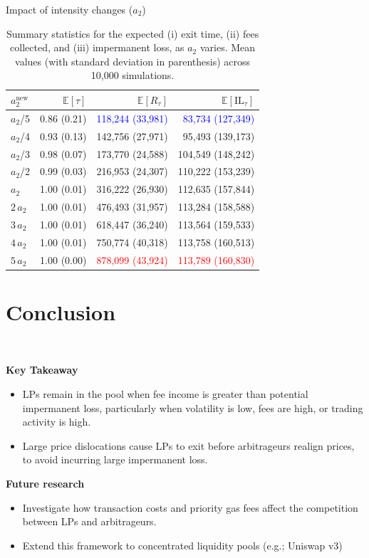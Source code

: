 \documentclass[10pt]{beamer}
\begin{document}
\begin{frame}{Impact of intensity changes ($a_2$)}
\begin{table}[H]
    \centering
    \begin{tabular}{l|rrr}
\hline
\hline
$a_2^{\mathrm{new}}$ & $\mathbb{E}[\tau]$ & $\mathbb{E}[R_\tau]$ & $\mathbb{E}[\mathrm{IL}_\tau]$ \\
\hline
\hline
$a_2$/5 & 0.86 (0.21) & \textcolor{blue}{118,244 (33,981)} & \textcolor{blue}{83,734 (127,349)} \\
$a_2$/4 & 0.93 (0.13) & 142,756 (27,971) & 95,493 (139,173) \\
$a_2$/3 & 0.98 (0.07) & 173,770 (24,588) & 104,549 (148,242) \\
$a_2$/2 & 0.99 (0.03) & 216,953 (24,307) & 110,222 (153,239) \\
$a_2$ & 1.00 (0.01) & 316,222 (26,930) & 112,635 (157,844) \\
$2\,a_2$ & 1.00 (0.01) & 476,493 (31,957) & 113,284 (158,588) \\
$3\,a_2$ & 1.00 (0.01) & 618,447 (36,240) & 113,564 (159,533) \\
$4\,a_2$ & 1.00 (0.01) & 750,774 (40,318) & 113,758 (160,513) \\
$5\,a_2$ & 1.00 (0.00) & \textcolor{red}{878,099 (43,924)} & \textcolor{red}{113,789 (160,830)} \\
\hline
\end{tabular}
    \caption{Summary statistics for the expected (i) exit time, (ii) fees collected, and (iii) impermanent loss, as $a_2$ varies. Mean values (with standard deviation in parenthesis) across 10,000 simulations.}
\end{table}
\end{frame}

\section{Conclusion}
\begin{frame}{\,}

\textbf{Key Takeaway}\pause
\begin{itemize}
	\item LPs remain in the pool when fee income is greater than potential impermanent loss, particularly when volatility is low, fees are high, or trading activity is high.\pause
	\item Large price dislocations cause LPs to exit before arbitrageurs realign prices, to avoid incurring large impermanent loss.\pause
\end{itemize}

\textbf{Future research}\pause
\begin{itemize}
	\item Investigate how transaction costs and priority gas fees affect the competition between LPs and arbitrageurs.\pause
	\item Extend this framework to concentrated liquidity pools (e.g.; Uniswap v3)
\end{itemize}

\end{frame}

\begin{frame}[allowframebreaks]{}
    \frametitle{}  %
    \renewcommand{\bibname}{}  %
    
    
\end{frame}
\end{document}
